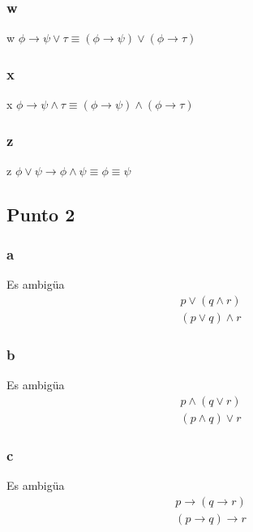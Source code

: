 \documentclass{article}
\begin{document}
\subsubsection{w}
\begin{logicenv}[5]{w}
    $\phi \to \psi \lor \tau \equiv (\phi \to \psi) \lor (\phi \to \tau)$
\end{logicenv}

\subsubsection{x}
\begin{logicenv}[5]{x}
    $\phi \to \psi \land \tau \equiv (\phi \to \psi) \land (\phi \to \tau)$
\end{logicenv}

\subsubsection{z}
\begin{logicenv}[5]{z}
    $\phi \lor \psi \to \phi \land \psi \equiv \phi \equiv \psi$
\end{logicenv}

\subsection{Punto 2}
\subsubsection{a}
\begin{logicenv}[5]{Es ambigüa}
    \begin{gather*}
        p \lor (q \land r)\\
        (p \lor q) \land r
    \end{gather*}
\end{logicenv}

\subsubsection{b}
\begin{logicenv}[5]{Es ambigüa}
    \begin{gather*}
        p \land (q \lor r)\\
        (p \land q) \lor r
    \end{gather*}
\end{logicenv}

\subsubsection{c}
\begin{logicenv}[5]{Es ambigüa}
    \begin{gather*}
        p \to (q \to r)\\
        (p \to q) \to r
    \end{gather*}
\end{logicenv}
\end{document}
